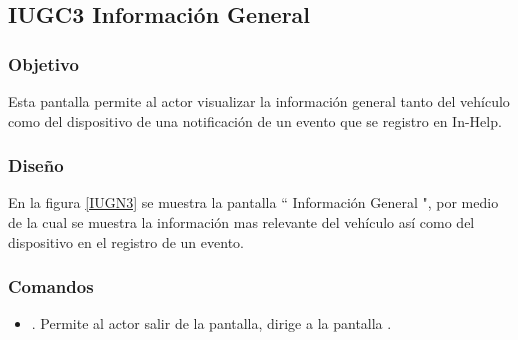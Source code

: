 \subsection{IUGC3 Información General}

\subsubsection{Objetivo}

	
    Esta pantalla permite al actor visualizar la información general tanto del vehículo como del dispositivo de una notificación de un evento que se registro en In-Help.

\subsubsection{Diseño}


    En la figura \ref{IUGN3} se muestra la pantalla `` Información General ", por medio de la cual se muestra la información mas relevante del vehículo así como del dispositivo en el registro de un evento.\\


\subsubsection{Comandos}
    \begin{itemize}
    	\item \btnRegresar[Regresar]. Permite al actor salir de la pantalla, dirige a la pantalla .
    \end{itemize}

